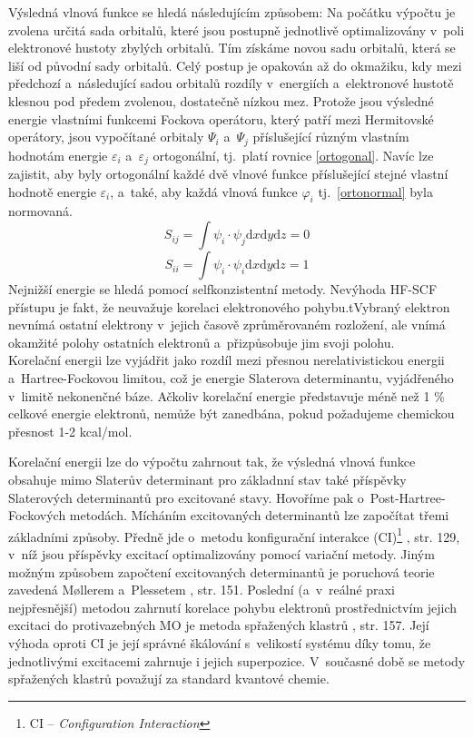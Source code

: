 \documentclass[
digital, %
table,   %
nolof,     %
nolot,     %
oneside,
]{fithesis3}
\begin{document}
Výsledná vlnová funkce se hledá následujícím způsobem: Na počátku výpočtu je zvolena určitá sada orbitalů, které jsou postupně jednotlivě optimalizovány v~poli elektronové hustoty zbylých orbitalů. Tím získáme novou sadu orbitalů, která se liší od původní sady orbitalů. Celý postup je opakován až do okmažiku, kdy mezi předchozí a~následující sadou orbitalů rozdíly v~energiích a~elektronové hustotě klesnou pod předem zvolenou, dostatečně nízkou mez. Protože jsou výsledné energie vlastními funkcemi Fockova operátoru, který patří mezi Hermitovské operátory, jsou vypočítané orbitaly $\Psi_i$ a~$\Psi_j$ příslušející různým vlastním hodnotám energie $\varepsilon_i $ a~$\varepsilon_j$ ortogonální, tj.~platí rovnice \ref{ortogonal}. Navíc lze zajistit, aby byly ortogonální každé dvě vlnové funkce příslušející stejné vlastní hodnotě energie $\varepsilon_i$, a~také, aby každá vlnová funkce $\varphi_i$ tj.~\ref{ortonormal} byla normovaná.
\begin{equation}
S_{ij} = \int \psi_i \cdot \psi_j \mathrm{d}x\mathrm{d}y\mathrm{d}z = 0
\label{ortogonal}
\end{equation}
\begin{equation}
S_{ii} = \int \psi_i \cdot \psi_i \mathrm{d}x\mathrm{d}y\mathrm{d}z = 1
\label{ortonormal}
\end{equation}
Nejnižší energie se hledá pomocí selfkonzistentní metody. Nevýhoda HF-SCF přístupu je fakt, že neuvažuje korelaci elektronového pohybu.tVybraný elektron nevnímá ostatní elektrony v~jejich časově zprůměrovaném rozložení, ale vnímá okamžité polohy ostatních elektronů a~přizpůsobuje jim svoji polohu.\\

Korelační energii lze vyjádřit jako rozdíl mezi přesnou nerelativistickou energii a~Hartree-Fockovou limitou, což je energie Slaterova determinantu, vyjádřeného v~limitě nekonenčné báze. Ačkoliv korelační energie představuje méně než 1 \% celkové energie elektronů, nemůže být zanedbána, pokud požadujeme chemickou přesnost 1-2 kcal/mol.

Korelační energii lze do výpočtu zahrnout tak, že výsledná vlnová funkce obsahuje mimo Slaterův determinant pro základnní stav také příspěvky Slaterových determinantů pro excitované stavy. Hovoříme pak o~Post-Hartree-Fockových metodách. Mícháním excitovaných determinantů lze započítat třemi základními způsoby. Předně jde o~metodu konfigurační interakce (CI)\footnote{CI -- \textit{Configuration Interaction}} \cite{jensen2017introduction}, str. 129, v~níž jsou příspěvky excitací optimalizovány pomocí variační metody. Jiným možným způsobem započtení excitovaných determinantů je poruchová teorie zavedená M{\o}llerem a~Plessetem \cite{jensen2017introduction}, str. 151. Poslední (a~v~reálné praxi nejpřesnější) metodou zahrnutí korelace pohybu elektronů prostřednictvím jejich excitaci do protivazebných MO je metoda spřažených klastrů \cite{jensen2017introduction}, str. 157. Její výhoda oproti CI je její správné škálování s~velikostí systému díky tomu, že jednotlivými excitacemi zahrnuje i jejich superpozice. V~současné době se metody spřažených klastrů považují za standard kvantové chemie.
\end{document}
